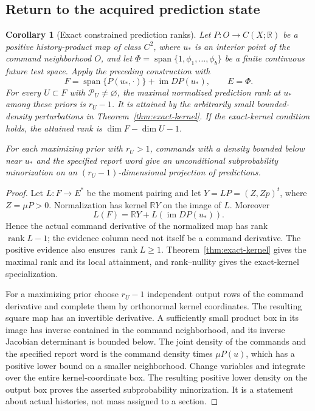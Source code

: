 \documentclass[11pt]{amsart}
\newtheorem{corollary}[theorem]{Corollary}
\theoremstyle{definition}\newtheorem{definition}[theorem]{Definition}
\theoremstyle{remark}\newtheorem{remark}[theorem]{Remark}
\newcommand{\R}{\mathbb R}\newcommand{\N}{\mathbb N}\newcommand{\C}{\mathbb C}
\DeclareMathOperator{\spanop}{span}\DeclareMathOperator{\rank}{rank}
\begin{document}
\subsection{Return to the acquired prediction state}
\begin{corollary}[Exact constrained prediction ranks]
\label{cor:kernel-history-rank}
Let $P:O\to C(X;\R)$ be a positive history-product map of class $C^2$,
where $u_*$ is an interior point of the command neighborhood $O$, and let
$\Phi=\spanop\{1,\phi_1,\ldots,\phi_b\}$ be a finite continuous
future test space. Apply the preceding construction with
\[
 F=\spanop\{P(u_*,\cdot)\}+\operatorname{im}DP(u_*),\qquad E=\Phi.
\]
For every $U\subset F$ with $\mathcal P_U\ne\varnothing$, the maximal
normalized prediction rank at $u_*$ among these priors is $r_U-1$.
It is attained by the arbitrarily small bounded-density perturbations
in Theorem~\ref{thm:exact-kernel}. If the exact-kernel condition holds,
the attained rank is $\dim F-\dim U-1$.

For each maximizing prior with $r_U>1$, commands with a density
bounded below near $u_*$
and the specified report word give an unconditional subprobability
minorization on an $(r_U-1)$-dimensional projection of predictions.
\end{corollary}
\begin{proof}
Let $L:F\to E^*$ be the moment pairing and let
$Y=LP=(Z,Zp)^t$, where $Z=\mu P>0$. Normalization has kernel
$\R Y$ on the image of $L$. Moreover
\[
 L(F)=\R Y+L(\operatorname{im}DP(u_*)).
\]
Hence the actual command derivative of the normalized map has rank
$\rank L-1$; the evidence column need not itself be a command
derivative. The positive evidence also ensures $\rank L\ge1$.
Theorem~\ref{thm:exact-kernel} gives the maximal rank and its local
attainment, and rank--nullity gives the exact-kernel specialization.

For a maximizing prior choose $r_U-1$ independent output rows of the
command derivative and complete them by orthonormal kernel coordinates.
The resulting square map has an invertible derivative. A sufficiently
small product box in its image has inverse contained in the command
neighborhood, and its inverse Jacobian determinant is bounded below.
The joint density of the commands and the specified report word is the
command density times $\mu P(u)$, which has a positive lower bound on
a smaller neighborhood. Change variables and integrate over the entire
kernel-coordinate box. The resulting positive lower density on the
output box proves the asserted subprobability minorization. It is a
statement about actual histories, not mass assigned to a section.
\end{proof}
\end{document}
